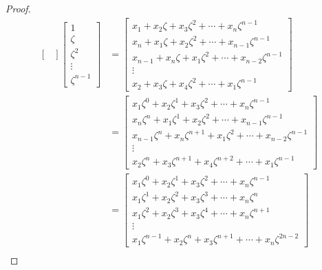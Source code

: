 \documentclass[../psets.tex]{subfiles}
\begin{document}
\begin{enumerate}
\begin{enumerate}
\begin{proof}
\begin{align*}
\begin{bmatrix}
                \end{bmatrix}
                \begin{bmatrix}
                    1\\
                    \zeta\\
                    \zeta^2\\
                    \vdots\\
                    \zeta^{n-1}
                \end{bmatrix}
                &=
                \begin{bmatrix}
                    x_1+x_2\zeta+x_3\zeta^2+\cdots+x_n\zeta^{n-1}\\
                    x_n+x_1\zeta+x_2\zeta^2+\cdots+x_{n-1}\zeta^{n-1}\\
                    x_{n-1}+x_n\zeta+x_1\zeta^2+\cdots+x_{n-2}\zeta^{n-1}\\
                    \vdots\\
                    x_2+x_3\zeta+x_4\zeta^2+\cdots+x_1\zeta^{n-1}
                \end{bmatrix}\\
                &=
                \begin{bmatrix}
                    x_1\zeta^0+x_2\zeta^1+x_3\zeta^2+\cdots+x_n\zeta^{n-1}\\
                    x_n\zeta^n+x_1\zeta^1+x_2\zeta^2+\cdots+x_{n-1}\zeta^{n-1}\\
                    x_{n-1}\zeta^n+x_n\zeta^{n+1}+x_1\zeta^2+\cdots+x_{n-2}\zeta^{n-1}\\
                    \vdots\\
                    x_2\zeta^n+x_3\zeta^{n+1}+x_4\zeta^{n+2}+\cdots+x_1\zeta^{n-1}
                \end{bmatrix}\\
                &=
                \begin{bmatrix}
                    x_1\zeta^0+x_2\zeta^1+x_3\zeta^2+\cdots+x_n\zeta^{n-1}\\
                    x_1\zeta^1+x_2\zeta^2+x_3\zeta^3+\cdots+x_n\zeta^n\\
                    x_1\zeta^2+x_2\zeta^3+x_3\zeta^4+\cdots+x_n\zeta^{n+1}\\
                    \vdots\\
                    x_1\zeta^{n-1}+x_2\zeta^n+x_3\zeta^{n+1}+\cdots+x_n\zeta^{2n-2}
                \end{bmatrix}\\

\end{align*}
\end{proof}
\end{enumerate}
\end{enumerate}
\end{document}
